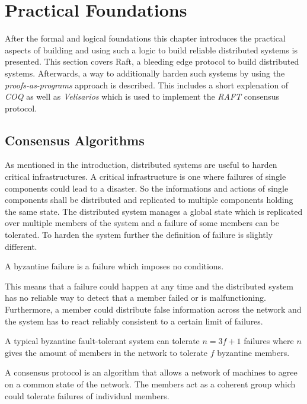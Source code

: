 %
\section{Practical Foundations}
\label{sec_3}

After the formal and logical foundations this chapter introduces
the practical aspects of building and using such a logic to build
reliable distributed systems is presented. This section covers Raft,
a bleeding edge protocol to build distributed systems.
Afterwards, a way to additionally harden such systems by using
the \textit{proofs-as-programs} approach is described.
This includes a short explenation of \textit{COQ} as well as
\textit{Velisarios} which is used to implement the \textit{RAFT}
consensus protocol.

\subsection{Consensus Algorithms}
As mentioned in the introduction, distributed systems are useful to harden
critical infrastructures. A critical infrastructure is one where failures
of single components could lead to a disaster. So the informations and
actions of single components shall be distributed and replicated to multiple
components holding the same state. The distributed system manages a
global state which is replicated over multiple members of the system and
a failure of some members can be tolerated. To harden the system further
the definition of failure is slightly different.~\cite{rahli2018velisarios}

\begin{defi}
  A byzantine failure is a failure which imposes no conditions.
\end{defi}

This means that a failure could happen at any time and the distributed
system has no reliable way to detect that a member failed or is malfunctioning.
Furthermore, a member could distribute false information across the network
and the system has to react reliably consistent to a certain limit of failures.~\cite{lamport1982byzantine}

\begin{defi}
  A typical byzantine fault-tolerant system can tolerate $n=3f+1$ failures
  where $n$ gives the amount of members in the network to tolerate $f$ byzantine
  members.
\end{defi}

\begin{defi}
  A consensus protocol is an algorithm that allows a network of machines to
  agree on a common state of the network. The members act as a coherent
  group which could tolerate failures of individual members.
\end{defi}

